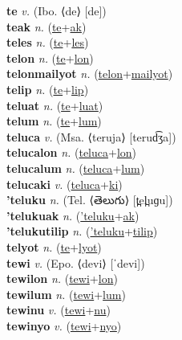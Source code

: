 \textbf{te} \textit{v.} (Ibo. ⟨de⟩ [de])
 \label{te} \\
\textbf{teak} \textit{n.} (\hyperref[te]{te}+\hyperref[ak]{ak})
 \label{teak} \\
\textbf{teles} \textit{n.} (\hyperref[te]{te}+\hyperref[les]{les})
 \label{teles} \\
\textbf{telon} \textit{n.} (\hyperref[te]{te}+\hyperref[lon]{lon})
 \label{telon} \\
\textbf{telonmailyot} \textit{n.} (\hyperref[telon]{telon}+\hyperref[mailyot]{mailyot})
 \label{telonmailyot} \\
\textbf{telip} \textit{n.} (\hyperref[te]{te}+\hyperref[lip]{lip})
 \label{telip} \\
\textbf{teluat} \textit{n.} (\hyperref[te]{te}+\hyperref[luat]{luat})
 \label{teluat} \\
\textbf{telum} \textit{n.} (\hyperref[te]{te}+\hyperref[lum]{lum})
 \label{telum} \\
\textbf{teluca} \textit{v.} (Msa. ⟨teruja⟩ [terud͡ʒa])
 \label{teluca} \\
\textbf{telucalon} \textit{n.} (\hyperref[teluca]{teluca}+\hyperref[lon]{lon})
 \label{telucalon} \\
\textbf{telucalum} \textit{n.} (\hyperref[teluca]{teluca}+\hyperref[lum]{lum})
 \label{telucalum} \\
\textbf{telucaki} \textit{v.} (\hyperref[teluca]{teluca}+\hyperref[ki]{ki})
 \label{telucaki} \\
\textbf{'teluku} \textit{n.} (Tel. ⟨తెలుగు⟩ [t̪el̪uɡu])
 \label{'teluku} \\
\textbf{'telukuak} \textit{n.} (\hyperref['teluku]{'teluku}+\hyperref[ak]{ak})
 \label{'telukuak} \\
\textbf{'telukutilip} \textit{n.} (\hyperref['teluku]{'teluku}+\hyperref[tilip]{tilip})
 \label{'telukutilip} \\
\textbf{telyot} \textit{n.} (\hyperref[te]{te}+\hyperref[lyot]{lyot})
 \label{telyot} \\
\textbf{tewi} \textit{v.} (Epo. ⟨devi⟩ [ˈdevi])
 \label{tewi} \\
\textbf{tewilon} \textit{n.} (\hyperref[tewi]{tewi}+\hyperref[lon]{lon})
 \label{tewilon} \\
\textbf{tewilum} \textit{n.} (\hyperref[tewi]{tewi}+\hyperref[lum]{lum})
 \label{tewilum} \\
\textbf{tewinu} \textit{v.} (\hyperref[tewi]{tewi}+\hyperref[nu]{nu})
 \label{tewinu} \\
\textbf{tewinyo} \textit{v.} (\hyperref[tewi]{tewi}+\hyperref[nyo]{nyo})
